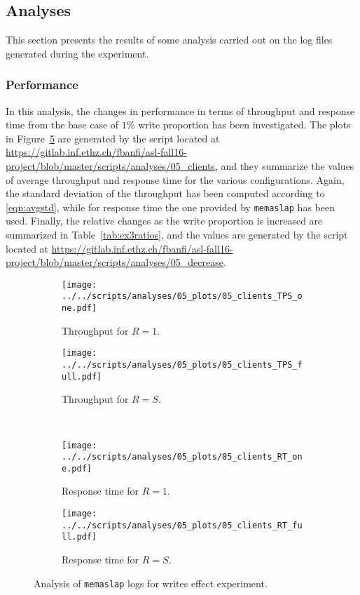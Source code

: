 \documentclass[11pt]{article}
\theoremstyle{definition}
\renewcommand\t\texttt
\begin{document}
\subsection{Analyses}

This section presents the results of some analysis carried out on the log files generated during the experiment.

\subsubsection{Performance}

In this analysis, the changes in performance in terms of throughput and response time from the base case of $1\%$ write proportion has been investigated.
The plots in Figure~\ref{fig:05_clients} are generated by the script located at \url{https://gitlab.inf.ethz.ch/fbanfi/asl-fall16-project/blob/master/scripts/analyses/05_clients}, and they summarize the values of average throughput and response time for the various configurations.
Again, the standard deviation of the throughput has been computed according to \ref{eqn:avgstd}, while for response time the one provided by \t{memaslap} has been used.
Finally, the relative changes as the write proportion is increased are summarized in Table~\ref{tab:ex3ratios}, and the values are generated by the script located at \url{https://gitlab.inf.ethz.ch/fbanfi/asl-fall16-project/blob/master/scripts/analyses/05_decrease}.

\begin{figure}[!h]
    \newcommand\wdt{7.7cm}
    \centering
    \begin{subfigure}[t]{\wdt}
        \centering
        \texttt{[image: ../../scripts/analyses/05\_plots/05\_clients\_TPS\_one.pdf]}
        \caption{Throughput for $R=1$.}\label{fig:05_clients-tps1}
    \end{subfigure}
    \hspace{0.2cm}
    \begin{subfigure}[t]{\wdt}
        \centering
        \texttt{[image: ../../scripts/analyses/05\_plots/05\_clients\_TPS\_full.pdf]}
        \caption{Throughput for $R=S$.}\label{fig:05_clients-tpsS}
    \end{subfigure}
    \\\vspace{3mm}
    \begin{subfigure}[t]{\wdt}
        \centering
        \texttt{[image: ../../scripts/analyses/05\_plots/05\_clients\_RT\_one.pdf]}
        \caption{Response time for $R=1$.}\label{fig:05_clients-rt1}
    \end{subfigure}
    \hspace{0.2cm}
    \begin{subfigure}[t]{\wdt}
        \centering
        \texttt{[image: ../../scripts/analyses/05\_plots/05\_clients\_RT\_full.pdf]}
        \caption{Response time for $R=S$.}\label{fig:05_clients-rtS}
    \end{subfigure}
    \caption{Analysis of \t{memaslap} logs for writes effect experiment.}
    \label{fig:05_clients}
\end{figure}
\end{document}
